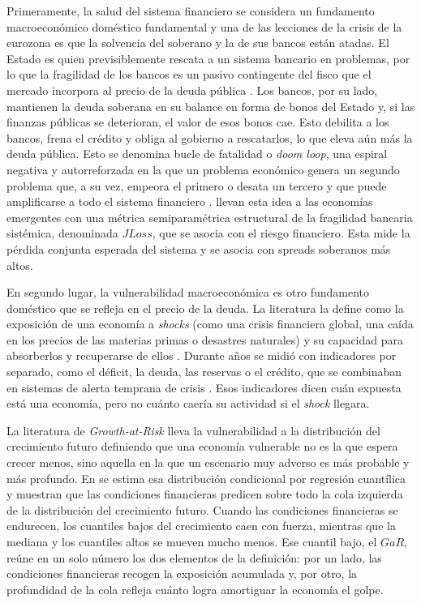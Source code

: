 Primeramente, la salud del sistema financiero se considera un fundamento macroeconómico doméstico
fundamental y una de las lecciones de la crisis de la eurozona es que la solvencia del soberano y la
de sus bancos están atadas. El Estado es quien previsiblemente rescata a un sistema bancario en
problemas, por lo que la fragilidad de los bancos es un pasivo contingente del fisco que el mercado
incorpora al precio de la deuda pública \citep{AcharyaDrechslerSchnabl2014b,ModySandri2012}. Los
bancos, por su lado, mantienen la deuda soberana en su balance en forma de bonos del Estado y, si las
finanzas públicas se deterioran, el valor de esos bonos cae. Esto debilita a los bancos, frena el
crédito y obliga al gobierno a rescatarlos, lo que eleva aún más la deuda pública. Esto se denomina
bucle de fatalidad o \textit{doom loop}, una espiral negativa y autorreforzada en la que un problema
económico genera un segundo problema que, a su vez, empeora el primero o desata un tercero y que puede
amplificarse a todo el sistema financiero \citep{FarhiTirole2018b,GennaioliMartinRossi2014}.
\citet{Chari2024b} llevan esta idea a las economías emergentes con una métrica semiparamétrica
estructural de la fragilidad bancaria sistémica, denominada $JLoss$, que se asocia con el riesgo
financiero. Esta mide la pérdida conjunta esperada del sistema y se asocia con spreads soberanos más
altos.

En segundo lugar, la vulnerabilidad macroeconómica es otro fundamento doméstico que se refleja en el
precio de la deuda. La literatura la define como la exposición de una economía a \textit{shocks}
(como una crisis financiera global, una caída en los precios de las materias primas o desastres
naturales) y su capacidad para absorberlos y recuperarse de ellos \citep{BriguglioEtAl2009}. Durante
años se midió con indicadores por separado, como el déficit, la deuda, las reservas o el crédito, que
se combinaban en sistemas de alerta temprana de crisis \citep{KaminskyLizondoReinhart1998}. Esos
indicadores dicen cuán expuesta está una economía, pero no cuánto caería su actividad si el
\textit{shock} llegara.

La literatura de \textit{Growth-at-Risk} lleva la vulnerabilidad a la distribución del crecimiento
futuro definiendo que una economía vulnerable no es la que espera crecer menos, sino aquella en la que
un escenario muy adverso es más probable y más profundo. En \citet{ABG2019b} se estima esa
distribución condicional por regresión cuantílica y muestran que las condiciones financieras predicen
sobre todo la cola izquierda de la distribución del crecimiento futuro. Cuando las condiciones
financieras se endurecen, los cuantiles bajos del crecimiento caen con fuerza, mientras que la mediana
y los cuantiles altos se mueven mucho menos. Ese cuantil bajo, el $GaR$, reúne en un solo número los
dos elementos de la definición: por un lado, las condiciones financieras recogen la exposición
acumulada y, por otro, la profundidad de la cola refleja cuánto logra amortiguar la economía el golpe.

